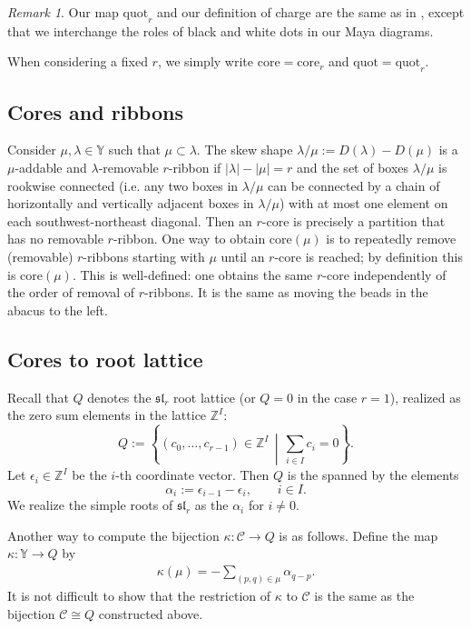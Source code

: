 \documentclass{amsart}
\newcommand{\Z}{\mathbb{Z}}
\newcommand{\Y}{\mathbb{Y}}
\newcommand{\cC}{\mathcal{C}}
\newcommand{\kb}{\kappa}
\newcommand{\la}{\lambda}
\newcommand{\core}{\mathrm{core}}
\newcommand{\quot}{\mathrm{quot}}
\theoremstyle{remark}
\newtheorem{rem}[thm]{Remark}
\numberwithin{thm}{section}
\numberwithin{equation}{section}
\begin{document}
\begin{rem}
Our map $\quot_r$ and our definition of charge are the same as in \cite{Wen}, except that we interchange the roles of black and white dots in our Maya diagrams.
\end{rem}

When considering a fixed $r$, we simply write $\core=\core_r$ and $\quot=\quot_r$.

\subsection{Cores and ribbons}

Consider $\mu,\la\in\Y$ such that $\mu\subset \la$. The skew shape $\la/\mu:=D(\la)-D(\mu)$ is a $\mu$-addable and $\la$-removable $r$-ribbon if $|\la|-|\mu|=r$ and the set of boxes $\la/\mu$ is rookwise connected (i.e. any two boxes in $\la/\mu$ can be connected by a chain of horizontally and vertically adjacent boxes in $\la/\mu$) with at most one element on each southwest-northeast diagonal. 
Then an $r$-core is precisely a partition that has no removable $r$-ribbon.
One way to obtain $\core(\mu)$ is to repeatedly remove (removable) $r$-ribbons starting with $\mu$ until an $r$-core is reached; by definition this is $\core(\mu)$. 
This is well-defined: one obtains the same $r$-core independently of the order of removal of $r$-ribbons. It is the same as moving the beads in the abacus to the left.

\subsection{Cores to root lattice}
Recall that $Q$ denotes the $\mathfrak{sl}_r$ root lattice (or $Q=0$ in the case $r=1$), realized as the zero sum elements in the lattice $\Z^I$:
\[
Q:=\left\{(c_0,\ldots, c_{r-1})\in\Z^I\, \middle|\, \sum_{i\in I}c_i=0\right\}.
\]
Let $\epsilon_i\in\Z^I$ be the $i$-th coordinate vector.
Then $Q$ is the spanned by the elements
\[
\alpha_i:=\epsilon_{i-1}-\epsilon_i,\qquad i\in I.
\]
We realize the simple roots of $\mathfrak{sl}_r$ as the $\alpha_i$ for $i\neq 0$.

Another way to compute the bijection $\kb: \cC \to Q$ is as follows.
Define the map $\kb:\Y\to Q$ by
\begin{align*}
  \kb(\mu) = -\sum_{(p,q)\in\mu} \alpha_{q-p}.
\end{align*}
It is not difficult to show that the restriction of $\kb$ to $\cC$ is the same as the bijection $\cC\cong Q$ constructed above.
\end{document}
